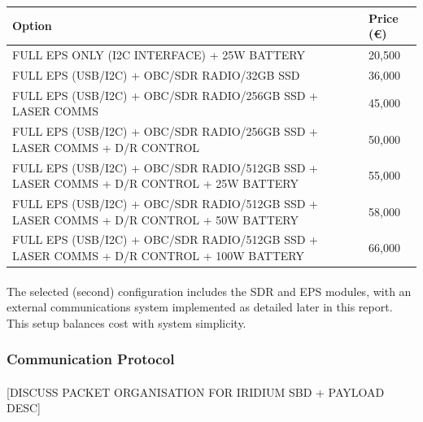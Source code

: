 \documentclass[11pt]{article}
\begin{document}
	\begin{center}
		\begin{tabular}{|p{12cm}|p{3cm}|}
			\hline
			\bf{Option} & \bf{Price (\euro)}\\ \hline
			FULL EPS ONLY (I2C INTERFACE) + 25W BATTERY & 20,500 \\ \hline
			FULL EPS (USB/I2C) + OBC/SDR RADIO/32GB SSD & 36,000 \\ \hline
			FULL EPS (USB/I2C) + OBC/SDR RADIO/256GB SSD + LASER COMMS & 45,000 \\ \hline
			FULL EPS (USB/I2C) + OBC/SDR RADIO/256GB SSD + LASER COMMS + D/R CONTROL & 50,000 \\ \hline
			FULL EPS (USB/I2C) + OBC/SDR RADIO/512GB SSD + LASER COMMS + D/R CONTROL + 25W BATTERY & 55,000 \\ \hline
			FULL EPS (USB/I2C) + OBC/SDR RADIO/512GB SSD + LASER COMMS + D/R CONTROL + 50W BATTERY & 58,000 \\ \hline
			FULL EPS (USB/I2C) + OBC/SDR RADIO/512GB SSD + LASER COMMS + D/R CONTROL + 100W BATTERY & 66,000 \\ \hline
		\end{tabular}
	\end{center}
	
	\paragraph{}The selected (second) configuration includes the SDR and EPS modules, with an external communications system implemented as detailed later in this report. This setup balances cost with system simplicity.
	
	\subsubsection{Communication Protocol}
	
	\paragraph{}[DISCUSS PACKET ORGANISATION FOR IRIDIUM SBD + PAYLOAD DESC]
	
\end{document}
